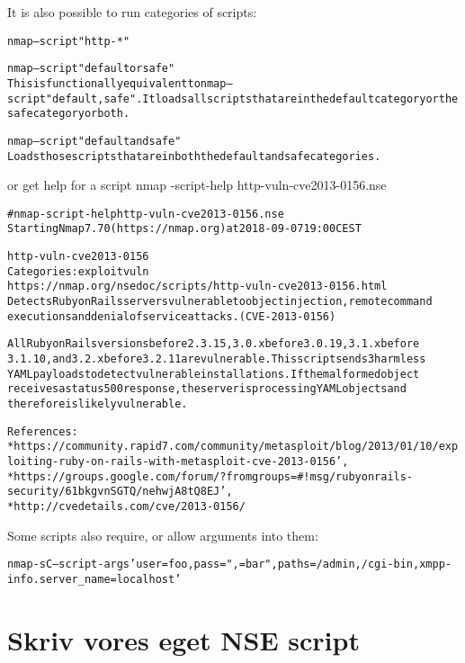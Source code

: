 \documentclass[a4paper,11pt,notitlepage]{report}
\begin{document}
It is also possible to run categories of scripts:

\begin{alltt}
nmap --script "http-*"

		   nmap --script "default or safe"
			   This is functionally equivalent to nmap --script "default,safe". It loads all scripts that are in the default category or the safe category or both.

		   nmap --script "default and safe"
			   Loads those scripts that are in both the default and safe categories.
\end{alltt}

or get help for a script
nmap -script-help http-vuln-cve2013-0156.nse

\begin{alltt}
# nmap -script-help http-vuln-cve2013-0156.nse
Starting Nmap 7.70 ( https://nmap.org ) at 2018-09-07 19:00 CEST

http-vuln-cve2013-0156
Categories: exploit vuln
https://nmap.org/nsedoc/scripts/http-vuln-cve2013-0156.html
  Detects Ruby on Rails servers vulnerable to object injection, remote command
  executions and denial of service attacks. (CVE-2013-0156)

  All Ruby on Rails versions before 2.3.15, 3.0.x before 3.0.19, 3.1.x before
  3.1.10, and 3.2.x before 3.2.11 are vulnerable. This script sends 3 harmless
  YAML payloads to detect vulnerable installations. If the malformed object
  receives a status 500 response, the server is processing YAML objects and
  therefore is likely vulnerable.

  References:
  * https://community.rapid7.com/community/metasploit/blog/2013/01/10/exploiting-ruby-on-rails-with-metasploit-cve-2013-0156',
  * https://groups.google.com/forum/?fromgroups=#!msg/rubyonrails-security/61bkgvnSGTQ/nehwjA8tQ8EJ',
  * http://cvedetails.com/cve/2013-0156/
\end{alltt}

Some scripts also require, or allow arguments into them:

\begin{alltt}
  nmap -sC --script-args 'user=foo,pass=",{}=bar",paths={/admin,/cgi-bin},xmpp-info.server_name=localhost'
\end{alltt}


\chapter{Skriv vores eget NSE script}
\label{ex:nmap-nse}
\end{document}
